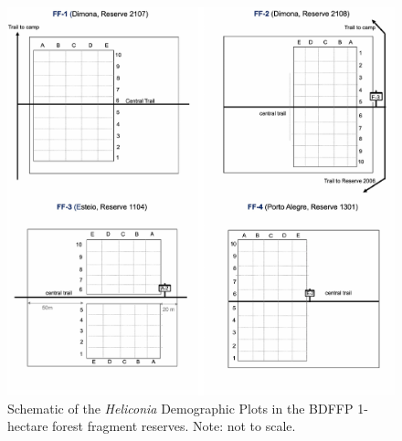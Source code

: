 \documentclass[
  12pt,
  man, donotrepeattitle,floatsintext]{apa6}
\begin{document}
\newpage

\begin{figure}[h]

{\centering \includegraphics{Bruna_etal_MetadataS1_files/figure-latex/plotsone-1} 

}

\caption{Schematic of the \textit{Heliconia} Demographic Plots in the BDFFP 1-hectare forest fragment reserves. Note: not to scale.}\label{fig:plotsone}
\end{figure}
\end{document}
